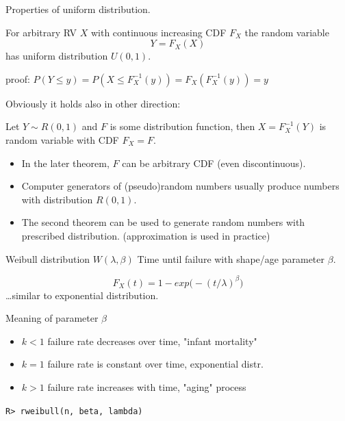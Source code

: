 \documentclass[smaller]{beamer}
\def\blue#1{{\usebeamercolor[fg]{my blue} #1}}
\def\xskip{{\vspace{2ex}}}
\begin{document}
\begin{frame}{Properties of uniform distribution.}
\begin{theorem}
For arbitrary RV $X$ with continuous increasing CDF $F_X$ the random variable 
\[
  Y=F_X(X)
\]
has uniform distribution $U(0,1)$. 
\end{theorem}
\blue{proof:} $P( Y \le y) = P( X \le F^{-1}_X(y))  = F_X( F^{-1}_X (y)) =y$

\xskip
Obviously it holds also in other direction:
\begin{theorem}
Let $Y \sim R(0,1)$ and $F$ is some distribution function, then $X = F_X^{-1}(Y)$ is random variable with CDF $F_X=F$.
\end{theorem}

\begin{itemize}
\item In the later theorem, $F$ can be arbitrary CDF (even discontinuous).
\item Computer generators of (pseudo)random numbers usually produce numbers with distribution $R(0,1)$.
\item The second theorem can be used to generate random numbers  with prescribed distribution. (approximation is used in practice)
\end{itemize}

\end{frame}



\begin{frame}[fragile]{Weibull distribution $W(\lambda, \beta)$}
Time until failure with shape/age parameter $\beta$.

\[
 F_X(t) = 1-exp\big( -(t/\lambda)^\beta \big )
\] 
\dots similar to exponential distribution.

\xskip
\blue{Meaning of parameter $\beta$}
\begin{itemize}
 \item  $k<1$ failure rate decreases over time, "infant mortality"
 \item  $k=1$ failure rate is constant over time, exponential distr.
 \item  $k>1$ failure rate increases with time, "aging" process
\end{itemize}

\verb'R> rweibull(n, beta, lambda)'
\end{frame}
\end{document}
